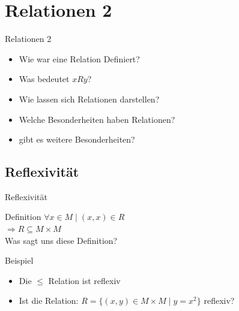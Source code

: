 	
	
	\section{Relationen 2}
	\begin{frame}{Relationen 2}
		\begin{itemize}
			\item Wie war eine Relation Definiert?
			
			\pause
			\item Was bedeutet $xRy$?
			
			\pause
			\item Wie lassen sich Relationen darstellen?
			
			\pause
			\item Welche Besonderheiten haben Relationen?
			
			\pause
			\item gibt es weitere Besonderheiten?
		\end{itemize}
	\end{frame}
	
	
	\subsection{Reflexivität}
	\begin{frame}{Reflexivität}
		\begin{block}{Definition}
			$\forall x \in M \;|\; (x,x) \in R$\\
			$\Rightarrow R \subseteq M \times M$\\
			\pause
			\vspace{10pt}
			Was sagt uns diese Definition?
		\end{block}
		
		\begin{exampleblock}{Beispiel}
			\begin{itemize}
				\item Die $\leq$ Relation ist reflexiv\\
					\visible<3->{\hspace{30pt} $\hookrightarrow$ Warum?}
					
				\pause
				\pause
				\item Ist die Relation: $R = \{(x,y)\in M \times M \;|\; y = x^2\} $ reflexiv?
			\end{itemize}
		\end{exampleblock}
	\end{frame}
	
	
